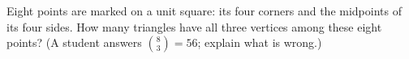 Eight points are marked on a unit square: its four corners and the midpoints of its four sides. How many triangles have all three vertices among these eight points? (A student answers $\binom83=56$; explain what is wrong.)
